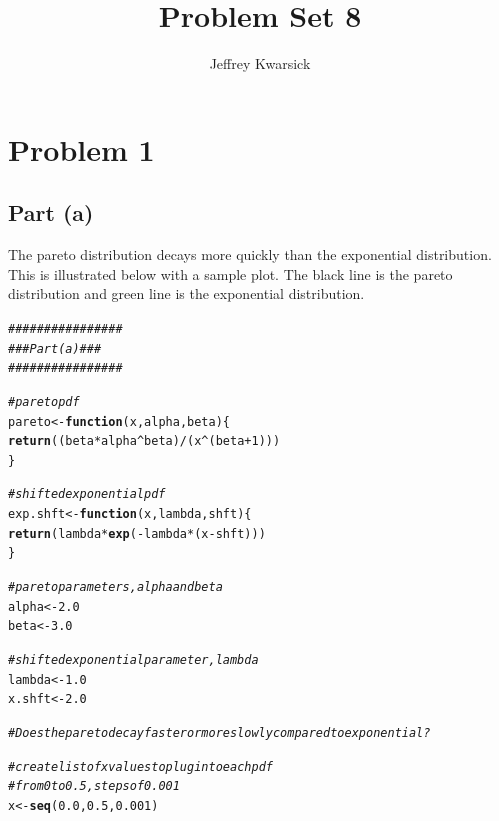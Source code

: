 \documentclass{article}\usepackage[]{graphicx}\usepackage[]{color}
\makeatletter
\newcommand{\hlnum}[1]{\textcolor[rgb]{0.686,0.059,0.569}{#1}}%
\newcommand{\hlcom}[1]{\textcolor[rgb]{0.678,0.584,0.686}{\textit{#1}}}%
\newcommand{\hlopt}[1]{\textcolor[rgb]{0,0,0}{#1}}%
\newcommand{\hlstd}[1]{\textcolor[rgb]{0.345,0.345,0.345}{#1}}%
\newcommand{\hlkwa}[1]{\textcolor[rgb]{0.161,0.373,0.58}{\textbf{#1}}}%
\newcommand{\hlkwb}[1]{\textcolor[rgb]{0.69,0.353,0.396}{#1}}%
\newcommand{\hlkwc}[1]{\textcolor[rgb]{0.333,0.667,0.333}{#1}}%
\newcommand{\hlkwd}[1]{\textcolor[rgb]{0.737,0.353,0.396}{\textbf{#1}}}%
\newenvironment{kframe}{%
 \def\at@end@of@kframe{}%
 \ifinner\ifhmode%
  \def\at@end@of@kframe{\end{minipage}}%
  \begin{minipage}{\columnwidth}%
 \fi\fi%
 \def\FrameCommand##1{\hskip\@totalleftmargin \hskip-\fboxsep
 \colorbox{shadecolor}{##1}\hskip-\fboxsep
     \hskip-\linewidth \hskip-\@totalleftmargin \hskip\columnwidth}%
 \MakeFramed {\advance\hsize-\width
   \@totalleftmargin\z@ \linewidth\hsize
   \@setminipage}}%
 {\par\unskip\endMakeFramed%
 \at@end@of@kframe}
\newenvironment{knitrout}{}{} %
\makeatother
\begin{document}
\title{Problem Set 8}
\author{Jeffrey Kwarsick}
\maketitle
\section{Problem 1}
\subsection{Part (a)}
The pareto distribution decays more quickly than the exponential distribution.  This is illustrated below with a sample plot.  The black line is the pareto distribution and green line is the exponential distribution.
\begin{knitrout}
\color{fgcolor}\begin{kframe}
\begin{alltt}
\hlcom{################}
\hlcom{### Part (a) ###}
\hlcom{################}

\hlcom{#pareto pdf}
\hlstd{pareto} \hlkwb{<-} \hlkwa{function}\hlstd{(}\hlkwc{x}\hlstd{,} \hlkwc{alpha}\hlstd{,} \hlkwc{beta}\hlstd{) \{}
  \hlkwd{return}\hlstd{( (beta}\hlopt{*}\hlstd{alpha}\hlopt{^}\hlstd{beta)}\hlopt{/}\hlstd{(x}\hlopt{^}\hlstd{(beta}\hlopt{+}\hlnum{1}\hlstd{)) )}
\hlstd{\}}

\hlcom{#shifted exponential pdf}
\hlstd{exp.shft} \hlkwb{<-} \hlkwa{function}\hlstd{(}\hlkwc{x}\hlstd{,} \hlkwc{lambda}\hlstd{,} \hlkwc{shft}\hlstd{) \{}
  \hlkwd{return}\hlstd{( lambda}\hlopt{*}\hlkwd{exp}\hlstd{(}\hlopt{-}\hlstd{lambda}\hlopt{*}\hlstd{(x}\hlopt{-}\hlstd{shft)) )}
\hlstd{\}}

\hlcom{#pareto parameters, alpha and beta}
\hlstd{alpha}  \hlkwb{<-} \hlnum{2.0}
\hlstd{beta}   \hlkwb{<-} \hlnum{3.0}

\hlcom{#shifted exponential parameter, lambda}
\hlstd{lambda} \hlkwb{<-} \hlnum{1.0}
\hlstd{x.shft} \hlkwb{<-} \hlnum{2.0}

\hlcom{#Does the pareto decay faster or more slowly compared to exponential?}

\hlcom{#create list of x values to plug into each pdf}
\hlcom{#from 0 to 0.5, steps of 0.001}
\hlstd{x} \hlkwb{<-} \hlkwd{seq}\hlstd{(}\hlnum{0.0}\hlstd{,} \hlnum{0.5}\hlstd{,} \hlnum{0.001}\hlstd{)}


\end{alltt}
\end{kframe}
\end{knitrout}
\end{document}
